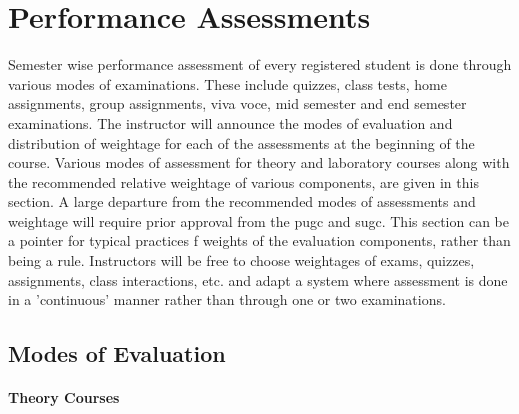 \section{Performance Assessments}

Semester wise performance assessment of every registered \gls{student} is done through various modes of examinations. These include quizzes, class tests, home assignments, group assignments, viva voce, mid semester and end semester examinations. The instructor will announce the modes of evaluation and distribution of weightage for each of the assessments at the beginning of the course. Various modes of assessment for theory and laboratory courses along with the recommended relative weightage of various components, are given in this section. A large departure from the recommended modes of assessments and weightage will require prior approval from the \acrshort{pugc} and \acrshort{sugc}. This section can be a pointer for typical practices f weights of the evaluation components, rather than being a rule. Instructors will be free to choose weightages of exams, quizzes, assignments, class interactions, etc. and adapt a system where assessment is done in a 'continuous' manner rather than through one or two examinations.

\subsection{Modes of Evaluation}

\paragraph{Theory Courses}

